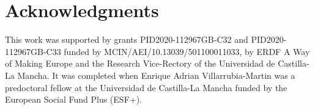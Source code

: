\documentclass[preprint,12pt]{elsarticle}
\begin{document}



\section*{Acknowledgments}

This work was supported by grants PID2020-112967GB-C32 and PID2020-112967GB-C33 funded by MCIN/AEI/10.13039/501100011033, by ERDF A Way of Making Europe and the Research Vice-Rectory of the Universidad de Castilla-La Mancha. It was completed when Enrique Adrian Villarrubia-Martin was a predoctoral fellow at the Universidad de Castilla-La Mancha funded by the European Social Fund Plus (ESF+).



\end{document}

